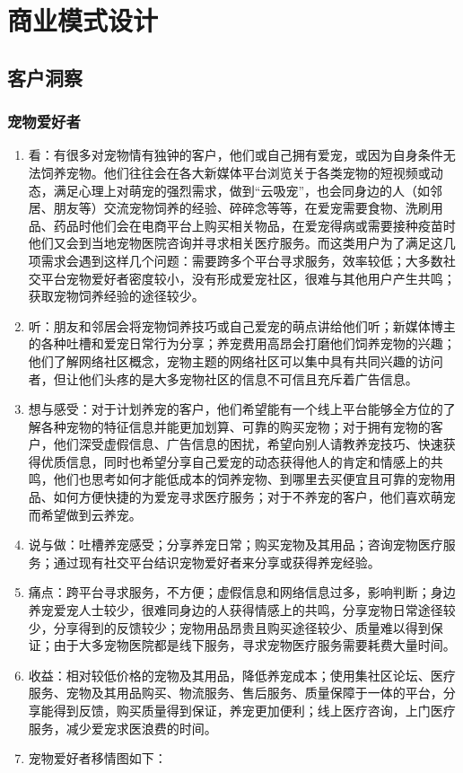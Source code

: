 \documentclass[a4paper]{ctexart}
\begin{document}
\section{商业模式设计}

\subsection{客户洞察}

\subsubsection{宠物爱好者}
\begin{enumerate}[label=\alph*.]
  \item 看：有很多对宠物情有独钟的客户，他们或自己拥有爱宠，或因为自身条件无法饲养宠物。他们往往会在各大新媒体平台浏览关于各类宠物的短视频或动态，满足心理上对萌宠的强烈需求，做到“云吸宠”，也会同身边的人（如邻居、朋友等）交流宠物饲养的经验、碎碎念等等，在爱宠需要食物、洗刷用品、药品时他们会在电商平台上购买相关物品，在爱宠得病或需要接种疫苗时他们又会到当地宠物医院咨询并寻求相关医疗服务。而这类用户为了满足这几项需求会遇到这样几个问题：需要跨多个平台寻求服务，效率较低；大多数社交平台宠物爱好者密度较小，没有形成爱宠社区，很难与其他用户产生共鸣；获取宠物饲养经验的途径较少。
  \item 听：朋友和邻居会将宠物饲养技巧或自己爱宠的萌点讲给他们听；新媒体博主的各种吐槽和爱宠日常行为分享；养宠费用高昂会打磨他们饲养宠物的兴趣；他们了解网络社区概念，宠物主题的网络社区可以集中具有共同兴趣的访问者，但让他们头疼的是大多宠物社区的信息不可信且充斥着广告信息。
  \item 想与感受：对于计划养宠的客户，他们希望能有一个线上平台能够全方位的了解各种宠物的特征信息并能更加划算、可靠的购买宠物；对于拥有宠物的客户，他们深受虚假信息、广告信息的困扰，希望向别人请教养宠技巧、快速获得优质信息，同时也希望分享自己爱宠的动态获得他人的肯定和情感上的共鸣，他们也思考如何才能低成本的饲养宠物、到哪里去买便宜且可靠的宠物用品、如何方便快捷的为爱宠寻求医疗服务；对于不养宠的客户，他们喜欢萌宠而希望做到云养宠。
  \item 说与做：吐槽养宠感受；分享养宠日常；购买宠物及其用品；咨询宠物医疗服务；通过现有社交平台结识宠物爱好者来分享或获得养宠经验。
  \item 痛点：跨平台寻求服务，不方便；虚假信息和网络信息过多，影响判断；身边养宠爱宠人士较少，很难同身边的人获得情感上的共鸣，分享宠物日常途径较少，分享得到的反馈较少；宠物用品昂贵且购买途径较少、质量难以得到保证；由于大多宠物医院都是线下服务，寻求宠物医疗服务需要耗费大量时间。
  \item 收益：相对较低价格的宠物及其用品，降低养宠成本；使用集社区论坛、医疗服务、宠物及其用品购买、物流服务、售后服务、质量保障于一体的平台，分享能得到反馈，购买质量得到保证，养宠更加便利；线上医疗咨询，上门医疗服务，减少爱宠求医浪费的时间。
  \item 宠物爱好者移情图如下：
\end{enumerate}
\end{document}
